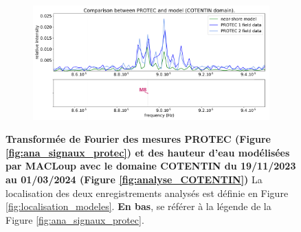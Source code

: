 \documentclass[10pt,a4paper,titlepage]{article}
\begin{document}
\begin{figure}[h!]
\begin{subfigure}{0.45\linewidth}
        \caption{}
    \end{subfigure}
    \begin{subfigure}{0.45\linewidth}
    \centering
    \includegraphics[scale=0.22]{../images/post_traitement/COTENTIN_analyse_near-shore_zoom3.pdf}
    \caption{}
    \end{subfigure}
    \caption{
        \textbf{Transformée de Fourier des mesures PROTEC (Figure \ref{fig:ana_signaux_protec}) et des hauteur d'eau modélisées par MACLoup avec le domaine COTENTIN du 19/11/2023 au 01/03/2024 (Figure \ref{fig:analyse_COTENTIN})}
        La localisation des deux enregistrements analysés est définie en Figure \ref{fig:localisation_modeles}.
        \textbf{En bas}, se référer à la légende de la Figure \ref{fig:ana_signaux_protec}.
    }
    \label{fig:ana_comp_protec_cotentin}
\end{figure}
\end{document}
